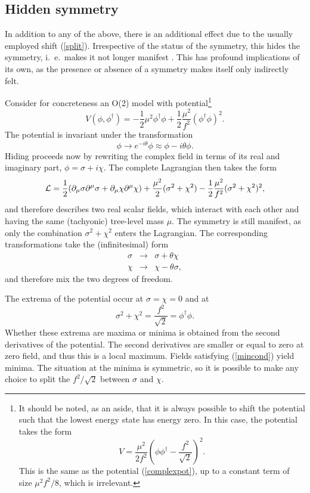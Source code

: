 \documentclass[final,12pt]{article}
\newcommand*{\La}{{\cal{L}}}
\newcommand*{\no}{\noindent}
\newcommand*{\bea}{\begin{eqnarray}}
\newcommand*{\eea}{\end{eqnarray}}
\newcommand*{\be}{\begin{equation}}
\newcommand*{\ee}{\end{equation}}
\newcommand*{\pd}{\partial}
\newcommand*{\pdm}{\pd_{\mu}}
\newcommand*{\pref}[1]{(\ref{#1})}
\newcommand*{\nn}{\nonumber}
\newcommand*{\1}{1\!\!\!\bot}
\begin{document}
\subsection{Hidden symmetry}\label{sss:hidden}

In addition to any of the above, there is an additional effect due to the usually employed shift \pref{split}. Irrespective of the status of the symmetry, this hides the symmetry, i.\ e.\ makes it not longer manifest \cite{O'Raifeartaigh:1978kv}. This has profound implications of its own, as the presence or absence of a symmetry makes itself only indirectly felt.

Consider for concreteness an O(2) model with potential\footnote{It should be noted, as an aside, that it is always possible to shift the potential such that the lowest energy state has energy zero. In this case, the potential takes the form
\be
V=\frac{\mu^2}{2f^2}\left(\phi\phi^\dagger-\frac{f^2}{\sqrt{2}}\right)^2.\label{o2model}
\ee
\no This is the same as the potential \pref{complexpot}, up to a constant term of size $\mu^2f^2/8$, which is irrelevant.}
\be
V(\phi,\phi^\dagger)=-\frac{1}{2}\mu^2\phi^\dagger\phi+\frac{1}{2}\frac{\mu^2}{f^2}(\phi^\dagger\phi)^2\label{complexpot}.
\ee
\no The potential is invariant under the transformation
\be
\phi\to e^{-i\theta}\phi\approx\phi-i\theta\phi.
\ee
\no Hiding proceeds now by rewriting the complex field in terms of its real and imaginary part, $\phi=\sigma+i\chi\nn$. The complete Lagrangian then takes the form
\be
\La=\frac{1}{2}(\pdm\sigma\pd^\mu\sigma+\pdm\chi\pd^\mu\chi)+\frac{\mu^2}{2}(\sigma^2+\chi^2)-\frac{1}{2}\frac{\mu^2}{f^2}(\sigma^2+\chi^2)^2\nn,
\ee
\no and therefore describes two real scalar fields, which interact with each other and having the same (tachyonic) tree-level mass $\mu$. The symmetry is still manifest, as only the combination $\sigma^2+\chi^2$ enters the Lagrangian. The corresponding transformations take the (infinitesimal) form
\bea
\sigma&\to&\sigma+\theta\chi\label{sxtrafo1}\\
\chi&\to&\chi-\theta\sigma\label{sxtrafo2},
\eea
\no and therefore mix the two degrees of freedom.

The extrema of the potential occur at $\sigma=\chi=0$ and at 
\be
\sigma^2+\chi^2=\frac{f^2}{\sqrt{2}}=\phi^\dagger\phi\label{mincond}.
\ee
\no Whether these extrema are maxima or minima is obtained from the second derivatives of the potential. The second derivatives are smaller or equal to zero at zero field, and thus this  is a local maximum. Fields satisfying \pref{mincond} yield minima. The situation at the minima is symmetric, so it is possible to make any choice to split the $f^2/\sqrt{2}$ between $\sigma$ and $\chi$.
\end{document}
